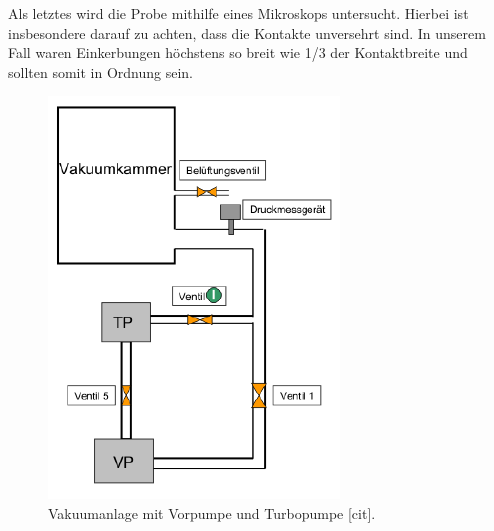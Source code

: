 \documentclass[twoside,        %
               BCOR12mm,       %
               english,ngerman, %
               fleqn,headsepline=false,footsepline=false
              ]{Vorlage/MFPREPORT}
\begin{document}
Als letztes wird die Probe mithilfe eines Mikroskops untersucht. Hierbei ist
insbesondere darauf zu achten, dass die Kontakte unversehrt sind. In unserem
Fall waren Einkerbungen höchstens so breit wie 1/3 der Kontaktbreite und
sollten somit in Ordnung sein.
\begin{figure}[]
    \centering
    \includegraphics{fig/vakuum.png}
    \caption{Vakuumanlage mit Vorpumpe und Turbopumpe [cit].}
    \label{fig:vakuum}
\end{figure}
\end{document}
